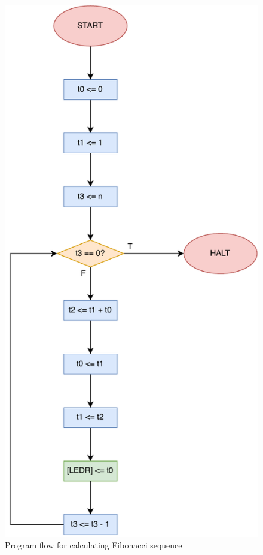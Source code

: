 \documentclass[12pt,a4paper,oneside]{book} %
\begin{document}
\label{fibonacci}
\begin{figure}[H]
    \centering
    \includegraphics[width=.5\textwidth]{images/flowchart/fibonacci.pdf}
    \caption{Program flow for calculating Fibonacci sequence}
\end{figure}
\end{document}
